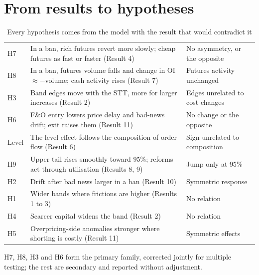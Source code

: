 \section{From results to hypotheses}
\begin{table}[t]
\caption[Hypotheses, their source and what would contradict them]{Every hypothesis comes from the model with the result that would contradict it}\label{tab:hyp}
\small\begin{tabularx}{\textwidth}{@{}K{1.1cm}LL@{}}
\toprule
\thd{} &  &  \\
\midrule
H7 & In a ban, rich futures revert more slowly; cheap futures as fast or faster (Result 4) & No asymmetry, or the opposite \\ \rowrule
H8 & In a ban, futures volume falls and change in OI $\approx -$volume; cash activity rises (Result 7) & Futures activity unchanged \\ \rowrule
H3 & Band edges move with the STT, more for larger increases (Result 2) & Edges unrelated to cost changes \\ \rowrule
H6 & F\&O entry lowers price delay and bad-news drift; exit raises them (Result 11) & No change or the opposite \\ \rowrule
Level & The level effect follows the composition of order flow (Result 6) & Sign unrelated to composition \\ \rowrule
H9 & Upper tail rises smoothly toward 95\%; reforms act through utilisation (Results 8, 9) & Jump only at 95\% \\ \rowrule
H2 & Drift after bad news larger in a ban (Result 10) & Symmetric response \\ \rowrule
H1 & Wider bands where frictions are higher (Results 1 to 3) & No relation \\ \rowrule
H4 & Scarcer capital widens the band (Result 2) & No relation \\ \rowrule
H5 & Overpricing-side anomalies stronger where shorting is costly (Result 11) & Symmetric effects \\
\bottomrule
\end{tabularx}
\end{table}
H7, H8, H3 and H6 form the primary family, corrected jointly for multiple testing; the rest are secondary and reported
without adjustment.
